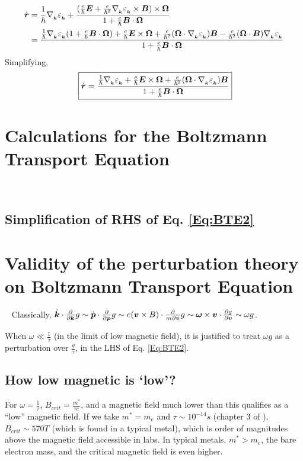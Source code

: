 \documentclass{report}
\renewcommand\vec[1]{\ensuremath\boldsymbol{#1}} %
\begin{document}
$$\begin{aligned}
\dot{\vec{r}} & = \frac{1}{\hbar} \nabla{_{_{\vec{k}}}} \varepsilon_{_{\vec{k}}} +\frac{ (\frac{e}{\hbar} \vec{E} + \frac{e}{\hbar^2} \nabla{_{_{\vec{k}}}} \varepsilon_{_{\vec{k}}} \times \vec{B}) \times \vec{\Omega}}{1 + \frac{e}{\hbar} \vec{B}\cdot\vec{\Omega}} \\
& = \frac{\frac{1}{\hbar} \nabla{_{_{\vec{k}}}} \varepsilon_{_{\vec{k}}} (1 + \frac{e}{\hbar} \vec{B}\cdot\vec{\Omega}) + \frac{e}{\hbar} \vec{E} \times \vec{\Omega} + \frac{e}{\hbar^2} (\vec{\Omega} \cdot \nabla{_{_{\vec{k}}}} \varepsilon_{_{\vec{k}}})\vec{B} - \frac{e}{\hbar^2} (\vec{\Omega} \cdot \vec{B})\nabla{_{_{\vec{k}}}} \varepsilon_{_{\vec{k}}}}{1 + \frac{e}{\hbar} \vec{B}\cdot\vec{\Omega}}
\end{aligned}
$$
Simplifying,
\begin{equation}~\label{Eq:decoupled-rdot-app}
\boxed{\dot{\vec{r}} = \frac{\frac{1}{\hbar} \nabla{_{_{\vec{k}}}} \varepsilon_{_{\vec{k}}} + \frac{e}{\hbar} \vec{E} \times \vec{\Omega} + \frac{e}{\hbar^2} (\vec{\Omega} \cdot \nabla{_{_{\vec{k}}}} \varepsilon_{_{\vec{k}}})\vec{B} }{1 + \frac{e}{\hbar} \vec{B}\cdot\vec{\Omega}}}
\end{equation}
\chapter{Calculations for the Boltzmann Transport Equation}~\label{app:BTE_Calc}
\section{Simplification of RHS of Eq. \eqref{Eq:BTE2}}
\chapter{Validity of the perturbation theory on Boltzmann Transport Equation}~\label{app:perturbation_validation}
Classically, $\dot{\vec{k}}\cdot\frac{\partial}{\partial \vec{k}} g \sim \dot{\vec{p}}\cdot\frac{\partial}{\partial \vec{p}} g \sim e (\vec{v}\times{B})\cdot\frac{\partial}{m\partial \vec{v}} g \sim \vec{\omega} \times \vec{v}\cdot \frac{\partial g}{\partial \vec{v}} \sim \omega g$.

When $\omega \ll \frac{1}{\tau}$ (in the limit of low magnetic field), it is justified to treat $\omega g$ as a perturbation over $\frac{g}{\tau}$, in the LHS of Eq. \eqref{Eq:BTE2}.
\section{How low magnetic is `low'?}
For $\omega = \frac{1}{\tau}$, $B_{crit} = \frac{m^*}{\tau e}$, and a magnetic field much lower than this qualifies as a ``low'' magnetic field. If we take $m^* = m_e$ and $\tau \sim 10^{-14} s$ (chapter 3 of \cite{book:SimonSolidState}), $B_{crit} \sim 570 T$ (which is found in a typical metal), which is order of magnitudes above the magnetic field accessible in labs. In typical metals, $m^* > m_e$, the bare electron mass, and the critical magnetic field is even higher.
\end{document}
